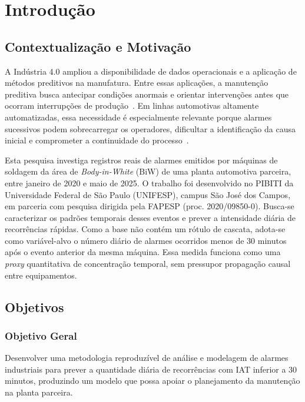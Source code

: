 \section{Introdução}
\label{sec:introducao}

\subsection{Contextualização e Motivação}

A Indústria 4.0 ampliou a disponibilidade de dados operacionais e a aplicação de métodos preditivos na manufatura. Entre essas aplicações, a manutenção preditiva busca antecipar condições anormais e orientar intervenções antes que ocorram interrupções de produção~\cite{pdm_challenges,pdm_models}. Em linhas automotivas altamente automatizadas, essa necessidade é especialmente relevante porque alarmes sucessivos podem sobrecarregar os operadores, dificultar a identificação da causa inicial e comprometer a continuidade do processo~\cite{rahaman2025alarmfloods}.

Esta pesquisa investiga registros reais de alarmes emitidos por máquinas de soldagem da área de \textit{Body-in-White} (BiW) de uma planta automotiva parceira, entre janeiro de 2020 e maio de 2025. O trabalho foi desenvolvido no PIBITI da Universidade Federal de São Paulo (UNIFESP), campus São José dos Campos, em parceria com pesquisa dirigida pela FAPESP (proc. 2020/09850-0). Busca-se caracterizar os padrões temporais desses eventos e prever a intensidade diária de recorrências rápidas. Como a base não contém um rótulo de cascata, adota-se como variável-alvo o número diário de alarmes ocorridos menos de 30 minutos após o evento anterior da mesma máquina. Essa medida funciona como uma \textit{proxy} quantitativa de concentração temporal, sem pressupor propagação causal entre equipamentos.

\subsection{Objetivos}

\subsubsection{Objetivo Geral}

Desenvolver uma metodologia reproduzível de análise e modelagem de alarmes industriais para prever a quantidade diária de recorrências com IAT inferior a 30 minutos, produzindo um modelo que possa apoiar o planejamento da manutenção na planta parceira.

